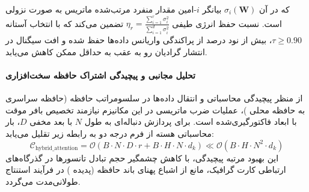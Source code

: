 که در آن $\sigma_i(\mathbf{W})$ بیانگر $i$-امین مقدار منفرد مرتب‌شده ماتریس به صورت نزولی است. نسبت حفظ انرژی طیفی $\eta_r = \frac{\sum_{i=1}^r \sigma_i^2}{\sum_{i=1}^{d} \sigma_i^2}$ تضمین می‌کند که با انتخاب آستانه $\tau \ge 0.90$، بیش از نود درصد از پراکندگی واریانس داده‌ها حفظ شده و افت سیگنال در انتشار گرادیان رو به عقب به حداقل ممکن کاهش می‌یابد.

\paragraph{تحلیل مجانبی و پیچیدگی اشتراک حافظه سخت‌افزاری}
از منظر پیچیدگی محاسباتی و انتقال داده‌ها در سلسومراتب حافظه (حافظه سراسری  به حافظه محلی )، عملیات ضرب ماتریسی در این مکانیزم نیازمند تخصیص بافر موقت با ابعاد فاکتورگیری‌شده است. برای پردازش دنباله‌ای به طول $N$ با بعد مخفی $D$، بار محاسباتی هسته از فرم درجه دو به رابطه زیر تقلیل می‌یابد:
\begin{equation}
\label{eq:complexity_hybrid_attention}
\mathcal{C}_{\text{hybrid\_attention}} = \mathcal{O}\left( B \cdot N \cdot D \cdot r + B \cdot H \cdot N \cdot d_k \right) \ll \mathcal{O}\left( B \cdot H \cdot N^2 \cdot d_k \right)
\end{equation}
این بهبود مرتبه پیچیدگی، با کاهش چشمگیر حجم تبادل تانسورها در گذرگاه‌های ارتباطی کارت گرافیک، مانع از اشباع پهنای باند حافظه (پدیده ) در فرآیند استنتاج طولانی‌مدت می‌گردد.

